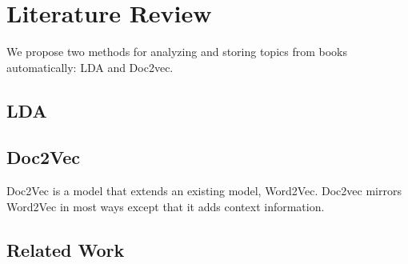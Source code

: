 
\section{Literature Review} \label{section:algorithms}
We propose two methods for analyzing and storing topics from books automatically: LDA and Doc2vec. 

\subsection{LDA}




\subsection{Doc2Vec}
Doc2Vec is a model that extends an existing model, Word2Vec.  
Doc2vec mirrors Word2Vec in most ways except that it adds context information. \cite{RefWorks:doc:5a6e5748e4b0d609eec798dd}




\subsection{Related Work}